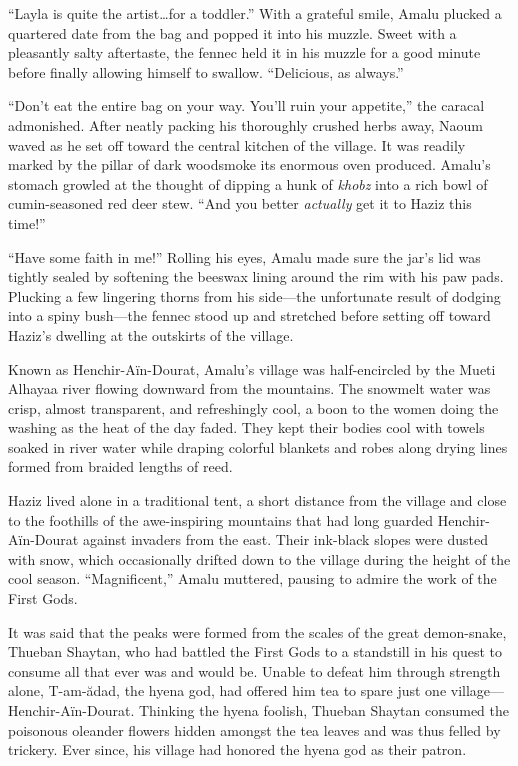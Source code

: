 ``Layla is quite the artist\ldots for a toddler.'' With a grateful smile, Amalu plucked a quartered date from the bag and popped it into his muzzle. Sweet with a pleasantly salty aftertaste, the fennec held it in his muzzle for a good minute before finally allowing himself to swallow. ``Delicious, as always.''

``Don't eat the entire bag on your way. You'll ruin your appetite,'' the caracal admonished. After neatly packing his thoroughly crushed herbs away, Naoum waved as he set off toward the central kitchen of the village. It was readily marked by the pillar of dark woodsmoke its enormous oven produced. Amalu's stomach growled at the thought of dipping a hunk of \emph{khobz} into a rich bowl of cumin-seasoned red deer stew. ``And you better \emph{actually} get it to Haziz this time!''

``Have some faith in me!'' Rolling his eyes, Amalu made sure the jar's lid was tightly sealed by softening the beeswax lining around the rim with his paw pads. Plucking a few lingering thorns from his side---the unfortunate result of dodging into a spiny bush---the fennec stood up and stretched before setting off toward Haziz's dwelling at the outskirts of the village.

Known as Henchir-Aïn-Dourat, Amalu's village was half-encircled by the Mueti Alhayaa river flowing downward from the mountains. The snowmelt water was crisp, almost transparent, and refreshingly cool, a boon to the women doing the washing as the heat of the day faded. They kept their bodies cool with towels soaked in river water while draping colorful blankets and robes along drying lines formed from braided lengths of reed.

Haziz lived alone in a traditional tent, a short distance from the village and close to the foothills of the awe-inspiring mountains that had long guarded Henchir-Aïn-Dourat against invaders from the east. Their ink-black slopes were dusted with snow, which occasionally drifted down to the village during the height of the cool season. ``Magnificent,'' Amalu muttered, pausing to admire the work of the First Gods.

It was said that the peaks were formed from the scales of the great demon-snake, Thueban Shaytan, who had battled the First Gods to a standstill in his quest to consume all that ever was and would be. Unable to defeat him through strength alone, T-am-ădad, the hyena god, had offered him tea to spare just one village---Henchir-Aïn-Dourat. Thinking the hyena foolish, Thueban Shaytan consumed the poisonous oleander flowers hidden amongst the tea leaves and was thus felled by trickery. Ever since, his village had honored the hyena god as their patron.

